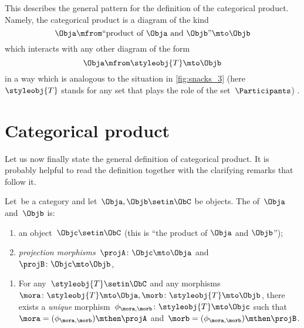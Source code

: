 This describes the general pattern for the definition of the categorical product.
Namely, the categorical product is a diagram of the kind
\begin{equation}
    \label{eq:prod-inline-generic-diagram}
    \Obja \mfrom \text{``product of } \Obja \text{ and } \Objb \text{''}  \mto \Objb
\end{equation}
which interacts with any other diagram of the form
\begin{equation}
    \label{eq:prod-inline-test-diagram}
    \Obja \mfrom \styleobj{T} \mto \Objb
\end{equation}
in a way which is analogous to the situation in \cref{fig:snacks_3} (here~$\styleobj{T}$ stands for any set that plays the role of the set~$\Participants$) .

\section{Categorical product}

Let us now finally state the general definition of categorical product.
It is probably helpful to read the definition together with the clarifying remarks that follow it.

\begin{ctdefinition}
    \label{def:categorical-product}
    Let~\CatC be a category and let~$\Obja, \Objb \setin \ObC$ be objects.
    The  of~$\Obja$ and~$\Objb$ is: \\
    \constit
    \begin{enumerate}
        \item an object~$\Objc \setin \ObC$ (this is ``the product of $\Obja$  and $\Objb$'');
        \item \emph{projection morphisms}~$\projA \colon \Objc \mto \Obja$ and~$\projB \colon \Objc \mto \Objb$,
    \end{enumerate}
    \condit
    \begin{enumerate}
        \item For any~$\styleobj{T} \setin \ObC$ and any morphisms~$\mora \colon \styleobj{T} \mto \Obja, \morb \colon \styleobj{T} \mto \Objb$, there exists a \emph{unique} morphism~$\phi_{\mora,\morb} \colon \styleobj{T} \mto \Objc$ such that~$\mora = (\phi_{\mora,
                      \morb})\mthen \projA$ and~$\morb=(\phi_{\mora, \morb})\mthen \projB$.
    \end{enumerate}
\end{ctdefinition}

